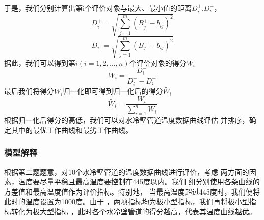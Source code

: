         于是，我们分别计算出第i个评价对象与最大、最小值的距离$D_i^+$,$D_i^-$，
        \begin{equation}
            D_i^+ = \sqrt{\sum_{j=1}^{m} (B_j^+ - b_{ij})^2}
        \end{equation}
        \begin{equation}
            D_i^- = \sqrt{\sum_{j=1}^{m} (B_j^- - b_{ij})^2}
        \end{equation}
        据此，我们可以得到第$i(i=1,2,…,n)$个评价对象的得分$W_i$
        \begin{equation}
            W_i = \frac{D_i^-}{D_i^+ - D_i^-}
        \end{equation}
        最后我们将得分$W_i$归一化即可得到归一化后的得分$\tilde{W_i}$
        \begin{equation}
            \tilde{W_i} = \frac{W_i}{\sum_{i=1}^{n} W_i}
        \end{equation}
        根据归一化后得分的高低，我们可以对水冷壁管道温度数据曲线评估
        并排序，确定其中的最优工作曲线和最劣工作曲线。

        \subsubsection{模型解释}
            根据第二题题意，对10个水冷壁管道的温度数据曲线进行评价，考虑
            两方面的因素，温度要尽量平稳且最高温度要控制在445度以内。我们
            组分别使用各条曲线的方差值和最高温度值作为评价指标。特别地，
            当最高温度超过445度时，我们便将此时的温度设置为1000度。由于
            ，两项指标均为极小型指标，我们再将极小型指标转化为极大型指标
            ，此时各个水冷壁管道的得分越高，代表其温度曲线越优。

